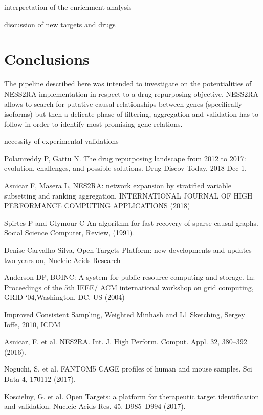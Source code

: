 \documentclass[fleqn,10pt]{SelfArx} %
\begin{document}
interpretation of the enrichment analysis

discussion of new targets and drugs

\section*{Conclusions}

The pipeline described here was intended to investigate on the potentialities of NESS2RA implementation in respect to a drug repurposing objective.
NESS2RA allows to search for putative causal relationships between genes (specifically isoforms) but then a delicate phase of filtering, aggregation and validation has to follow in order to identify most promising gene relations.

necessity of experimental validations


%
\begin{thebibliography}{1}
	
	 Polamreddy P, Gattu N. The drug repurposing landscape from 2012 to 2017: evolution, challenges, and possible solutions. Drug Discov Today. 2018 Dec 1.	

	 Asnicar F, Masera L, NES2RA: network expansion by stratified variable subsetting and ranking aggregation. INTERNATIONAL JOURNAL OF HIGH PERFORMANCE COMPUTING APPLICATIONS (2018)
	
	Spirtes P and Glymour C An algorithm for fast recovery
of sparse causal graphs. Social Science Computer, Review, (1991).  

	Denise Carvalho-Silva, Open Targets Platform: new developments and updates two years on, Nucleic Acids Research 

	Anderson DP, BOINC: A system for public-resource computing and storage. In: Proceedings of the 5th IEEE/ ACM international workshop on grid computing, GRID ‘04,Washington, DC, US (2004)
	
	Improved Consistent Sampling, Weighted Minhash and L1 Sketching, Sergey Ioffe, 2010, ICDM
	
	 Asnicar, F. et al. NES2RA. Int. J. High Perform. Comput. Appl. 32, 380–392 (2016).
	
	
	 Noguchi, S. et al. FANTOM5 CAGE profiles of human and mouse samples. Sci Data 4, 170112 (2017).
	
	
	 Koscielny, G. et al. Open Targets: a platform for therapeutic target identification and validation. Nucleic Acids Res. 45, D985–D994 (2017).
	
	
\end{thebibliography}
\end{document}
